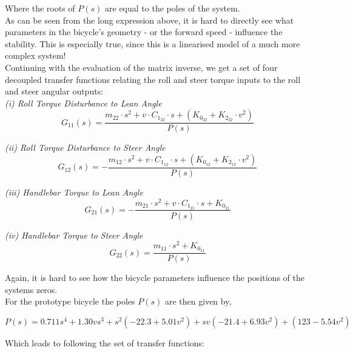\documentclass[a4paper]{article}
\begin{document}
\noindent Where the roots of $P(s)$ are equal to the poles of the system. \\

\noindent As can be seen from the long expression above, it is hard to directly see what parameters in the bicycle's geometry - or the forward speed - influence the stability. This is especially true, since this is a linearised model of a much more complex system! \\

\noindent Continuing with the evaluation of the matrix inverse, we get a set of four decoupled transfer functions relating the roll and steer torque inputs to the roll and steer angular outputs: \\

\noindent \textit{(i) Roll Torque Disturbance to Lean Angle}
\begin{equation*}
G_{11}(s) = \frac{m_{22} \cdot s^2 + v \cdot C_{1_{22}} \cdot s + (K_{0_{22}} + K_{2_{22}} \cdot v^2)}{P(s)}
\end{equation*}

\noindent \textit{(ii) Roll Torque Disturbance to Steer Angle}
\begin{equation*}
G_{12}(s) = - \frac{m_{12} \cdot s^2 + v \cdot C_{1_{12}} \cdot s + (K_{0_{12}} + K_{2_{12}} \cdot v^2)}{P(s)}
\end{equation*}

\noindent \textit{(iii) Handlebar Torque to Lean Angle}
\begin{equation*}
G_{21}(s) = - \frac{m_{21} \cdot s^2 + v \cdot C_{1_{21}} \cdot s + K_{0_{21}}}{P(s)}
\end{equation*}

\noindent \textit{(iv) Handlebar Torque to Steer Angle}
\begin{equation*}
G_{22}(s) = \frac{m_{11} \cdot s^2 + K_{0_{11}}}{P(s)}
\end{equation*}

\noindent Again, it is hard to see how the bicycle parameters influence the positions of the systems zeros. \\

\noindent For the prototype bicycle the poles $P(s)$ are then given by,

\begin{equation}
P(s) = 0.711 s^4 + 1.30 v s^3 + s^2 (-22.3 + 5.01 v^2) + s v(-21.4 + 6.93 v^2) + (123 - 5.54 v^2)
\end{equation}

\noindent Which leads to following the set of transfer functions:
\end{document}
